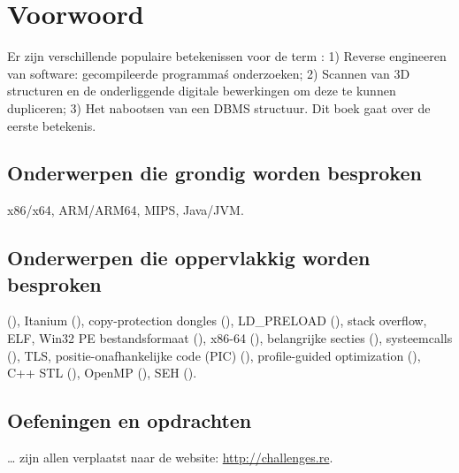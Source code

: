 \section*{Voorwoord}

Er zijn verschillende populaire betekenissen voor de term :
1) Reverse engineeren van software: gecompileerde programma\'s onderzoeken;
2) Scannen van 3D structuren en de onderliggende digitale bewerkingen om deze te kunnen dupliceren;
3) Het nabootsen van een \ac{DBMS} structuur.
Dit boek gaat over de eerste betekenis.

\subsection*{Onderwerpen die grondig worden besproken}

x86/x64, ARM/ARM64, MIPS, Java/JVM.

\subsection*{Onderwerpen die oppervlakkig worden besproken}

\oracle (),
Itanium (),
copy-protection dongles (), 
LD\_PRELOAD (),
stack overflow,
\ac{ELF},
Win32 PE bestandsformaat (),
x86-64 (),
belangrijke secties (),
systeemcalls (), 
\ac{TLS},
positie-onafhankelijke code (\ac{PIC}) (), 
profile-guided optimization (),
C++ STL (),
OpenMP (),
SEH ().

\subsection*{Oefeningen en opdrachten}

\dots 
zijn allen verplaatst naar de website: \url{http://challenges.re}.

